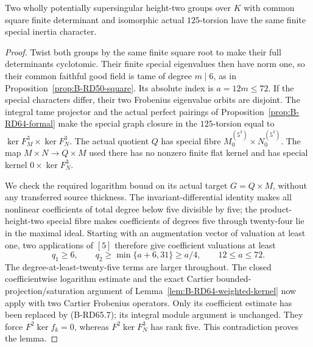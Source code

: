 \begin{lemma}
\label{lem:B-RD65-square}
Two wholly potentially supersingular height-two groups over $K$
with common square finite determinant and isomorphic actual
$125$-torsion have the same finite special inertia character.
\end{lemma}
\begin{proof}
Twist both groups by the same finite square root to make their
full determinants cyclotomic. Their finite special eigenvalues
then have norm one, so their common faithful good field is tame
of degree $m\mid6$, as in Proposition~\ref{prop:B-RD50-square}.
Its absolute index is $a=12m\le72$.
If the special characters differ, their two Frobenius eigenvalue
orbits are disjoint. The integral tame projector and the actual
perfect pairings of Proposition~\ref{prop:B-RD64-formal} make the
special graph closure in the $125$-torsion equal to
$\ker F_M^3\times\ker F_N^3$. The actual quotient $Q$ has special
fibre $M_0^{(5^3)}\times N_0^{(5^3)}$.
The map $M\times N\to Q\times M$ used there has no nonzero finite
flat kernel and has special kernel $0\times\ker F_N^3$.

We check the required logarithm bound on its actual target
$G=Q\times M$, without any transferred source thickness.
The invariant-differential identity makes all nonlinear coefficients
of total degree below five divisible by five; the product-height-two
special fibre makes coefficients of degrees five through twenty-four
lie in the maximal ideal. Starting with an augmentation vector of
valuation at least one, two applications of $[5]$ therefore give
coefficient valuations at least
\[
 q_1\ge6,\qquad q_2\ge\min\{a+6,31\}\ge a/4,
                    \qquad 12\le a\le72.                  \tag{B-RD65.7}
\]
The degree-at-least-twenty-five terms are larger throughout.
The closed coefficientwise logarithm estimate and the exact
Cartier bounded-projection/saturation argument of
Lemma~\ref{lem:B-RD64-weighted-kernel} now apply with two
Cartier Frobenius operators. Only its coefficient estimate has
been replaced by (B-RD65.7); its integral module argument is
unchanged. They force $F^2\ker f_k=0$, whereas
$F^2\ker F_N^3$ has rank five. This contradiction proves the lemma.
\end{proof}

